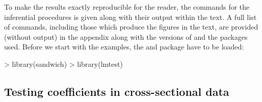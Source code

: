 \documentclass{Z}
\begin{document}
To make the results exactly reproducible for the reader, the commands
for the inferential procedures is given along with their output
within the text. A full list of commands, including
those which produce the figures in the text, are provided (without output) in the
appendix along with the versions of  and the packages used.
Before we start with the examples, the  and  package
have to be loaded:
\begin{Schunk}
\begin{Sinput}
> library(sandwich)
> library(lmtest)
\end{Sinput}
\end{Schunk}

\subsection{Testing coefficients in cross-sectional data}
\end{document}
